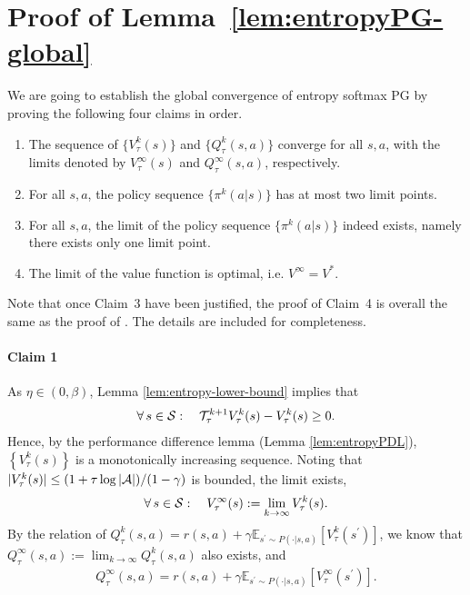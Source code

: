 \section{Proof of Lemma~\ref{lem:entropyPG-global}}\label{sec:proof-entropyPG-global}
    
    We are going to establish the global convergence of entropy softmax PG by proving the following four claims in order.
    \begin{enumerate}
        \item The sequence of $\{ V^k_\tau(s) \}$ and $\{ Q^k_\tau(s,a) \}$  converge for all $s, a$, with the limits denoted by $V^\infty_\tau(s)$ and $Q^\infty_\tau(s,a)$, respectively.
        \item For all $s,a$, the policy  sequence $\{\pi^k(a|s)\}$ has at most two limit points. 
        \item For all $s,a$, the limit of the policy sequence $\{ \pi^k(a|s) \}$ indeed exists, namely there  exists only one limit point.
        \item The limit of the value function is optimal, i.e. $V^\infty = V^*$.
    \end{enumerate}
    Note that once Claim~3 have been justified, the proof of Claim~4 is overall the same as the proof of \cite[Lemma~16]{Mei_Xiao_Szepesvari_Schuurmans_2020}. The details are included for completeness.

    \paragraph{Claim 1} As $\eta \in (0, \beta)$, Lemma \ref{lem:entropy-lower-bound} implies that 
    \begin{align*}
        \forall\, s\in{\cal S}: \quad {\cal T}_\tau^{k+1} V^k_\tau(s) - V^k_\tau(s) \geq 0.
    \end{align*}
    Hence, by the performance difference lemma (Lemma \ref{lem:entropyPDL}), $\left\{ V^k_{\tau}(s) \right\}$ is a monotonically increasing sequence. Noting that $|V^k_\tau(s)| \leq (1+\tau\log|{\cal A}|) / (1-\gamma)$ is bounded, the limit exists,
    \begin{align*}
        \forall\, s\in{\cal S}: \quad V^\infty_\tau(s) := \lim_{k\to\infty} V^k_\tau(s).
    \end{align*}
    By the relation of
    $
        Q^k_\tau(s,a) = r(s,a) + \gamma \mathbb{E}_{s^\prime \sim P(\cdot|s,a)} \left[ V^k_\tau(s^\prime) \right]
    $,
    we know that $Q^\infty_\tau(s,a):=\lim_{k\rightarrow\infty}Q^k_\tau(s,a)$ also exists, and \begin{align*}Q^\infty_\tau(s,a) = r(s,a) + \gamma\mathbb{E}_{s^\prime \sim P(\cdot|s,a)} \left[  V^\infty_\tau(s^\prime) \right].
    \end{align*}
    

